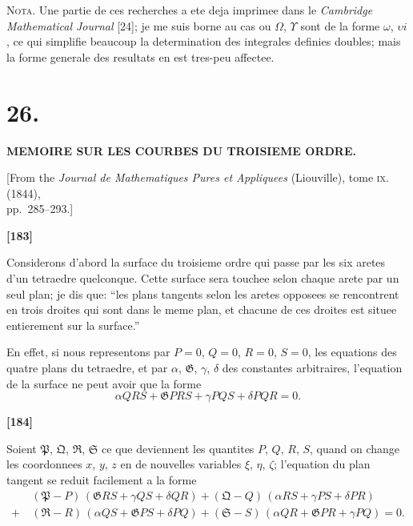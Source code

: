 \documentclass[11pt,a4paper]{article}
\begin{document}
\textsc{Nota.} Une partie de ces recherches a ete deja imprimee dans le \textit{Cambridge
Mathematical Journal} [24]; je me suis borne au cas ou $\Omega$, $\Upsilon$ sont de la forme $\omega$, $\upsilon i$, ce
qui simplifie beaucoup la determination des integrales definies doubles; mais la forme
generale des resultats en est tres-peu affectee.

\newpage
\section*{26.}

\begin{center}
\textbf{MEMOIRE SUR LES COURBES DU TROISIEME ORDRE.}
\end{center}

\begin{center}
[From the \textit{Journal de Mathematiques Pures et Appliquees} (Liouville), tome \textsc{ix}. (1844),\\
pp.~285--293.]
\end{center}


\textbf{[183]}

Considerons d'abord la surface du troisieme ordre qui passe par les six aretes d'un
tetraedre quelconque. Cette surface sera touchee selon chaque arete par un seul plan;
je dis que: ``les plans tangents selon les aretes opposees se rencontrent en trois droites
qui sont dans le meme plan, et chacune de ces droites est situee entierement sur la
surface.''

En effet, si nous representons par $P = 0$, $Q = 0$, $R = 0$, $S = 0$, les equations des quatre
plans du tetraedre, et par $\alpha$, $\mathfrak{G}$, $\gamma$, $\delta$ des constantes arbitraires, l'equation de la surface
ne peut avoir que la forme
\[\alpha QRS + \mathfrak{G} PRS + \gamma PQS + \delta PQR = 0.\]

\textbf{[184]}

Soient $\mathfrak{P}$, $\mathfrak{Q}$, $\mathfrak{R}$, $\mathfrak{S}$ ce que deviennent les quantites $P$, $Q$, $R$, $S$, quand on change les
coordonnees $x$, $y$, $z$ en de nouvelles variables $\xi$, $\eta$, $\zeta$; l'equation du plan tangent se reduit
facilement a la forme
\begin{align*}
&(\mathfrak{P} - P)\, (\mathfrak{G}RS + \gamma QS + \delta QR) + (\mathfrak{Q} - Q)\, (\alpha RS + \gamma PS + \delta PR)\\
+\ &(\mathfrak{R} - R)\, (\alpha QS + \mathfrak{G}PS + \delta PQ) + (\mathfrak{S} - S)\, (\alpha QR + \mathfrak{G}PR + \gamma PQ) = 0.
\end{align*}
\end{document}
